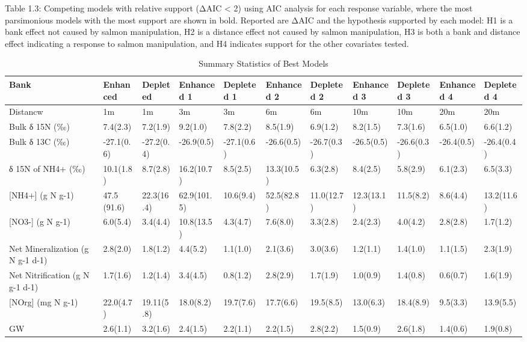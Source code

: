 \documentclass [11pt, proquest] {uwthesis}[2015/03/03]
\begin{document}
\endgroup{}
\clearpage
\begin{landscape}

Table 1.3: Competing models with relative support (ΔAIC < 2) using AIC analysis for each response variable, where the most parsimonious models with the most support are shown in bold. Reported are ΔAIC and the hypothesis supported by each model: H1 is a bank effect not caused by salmon manipulation, H2 is a distance effect not caused by salmon manipulation, H3 is both a bank and distance effect indicating a response to salmon manipulation, and H4 indicates support for the other covariates tested. 
\begingroup\fontsize{8}{10}\selectfont
\begin{longtable}[t]{lllllllllll}
\caption{\label{tab:suppsumm}Summary Statistics of Best Models}\\
\toprule
Bank & Enhanced & Depleted & Enhanced 1 & Depleted 1 & Enhanced 2 & Depleted 2 & Enhanced 3 & Depleted 3 & Enhanced 4 & Depleted 4\\
\midrule
Distancw & 1m & 1m & 3m & 3m & 6m & 6m & 10m & 10m & 20m & 20m\\
Bulk δ 15N (‰) & 7.4(2.3) & 7.2(1.9) & 9.2(1.0) & 7.8(2.2) & 8.5(1.9) & 6.9(1.2) & 8.2(1.5) & 7.3(1.6) & 6.5(1.0) & 6.6(1.2)\\
Bulk δ 13C (‰) & -27.1(0.6) & -27.2(0.4) & -26.9(0.5) & -27.1(0.6) & -26.6(0.5) & -26.7(0.3) & -26.5(0.5) & -26.6(0.3) & -26.4(0.5) & -26.4(0.4)\\
δ 15N of NH4+ (‰) & 10.1(1.8) & 8.7(2.8) & 16.2(10.7) & 8.5(2.5) & 13.3(10.5) & 6.3(2.8) & 8.4(2.5) & 5.8(2.9) & 6.1(2.3) & 6.5(3.3)\\
{}[NH4+] (g N g-1) & 47.5 (91.6) & 22.3(16.4) & 62.9(101.5) & 10.6(9.4) & 52.5(82.8) & 11.0(12.7) & 12.3(13.1) & 11.5(8.2) & 8.6(4.4) & 13.2(11.6)\\
\addlinespace
{}[NO3-] (g N g-1) & 6.0(5.4) & 3.4(4.4) & 10.8(13.5) & 4.3(4.7) & 7.6(8.0) & 3.3(2.8) & 2.4(2.3) & 4.0(4.2) & 2.8(2.8) & 1.7(1.2)\\
Net Mineralization (g N g-1 d-1) & 2.8(2.0) & 1.8(1.2) & 4.4(5.2) & 1.1(1.0) & 2.1(3.6) & 3.0(3.6) & 1.2(1.1) & 1.4(1.0) & 1.1(1.5) & 2.3(1.9)\\
Net Nitrification (g N g-1 d-1) & 1.7(1.6) & 1.2(1.4) & 3.4(4.5) & 0.8(1.2) & 2.8(2.9) & 1.7(1.9) & 1.0(0.9) & 1.4(0.8) & 0.6(0.7) & 1.6(1.9)\\
{}[NOrg] (mg N g-1) & 22.0(4.7) & 19.11(5.8) & 18.0(8.2) & 19.7(7.6) & 17.7(6.6) & 19.5(8.5) & 13.0(6.3) & 18.4(8.9) & 9.5(3.3) & 13.9(5.5)\\
GW & 2.6(1.1) & 3.2(1.6) & 2.4(1.5) & 2.2(1.1) & 2.2(1.5) & 2.8(2.2) & 1.5(0.9) & 2.6(1.8) & 1.4(0.6) & 1.9(0.8)\\

\end{longtable}
\end{landscape}
\end{document}
